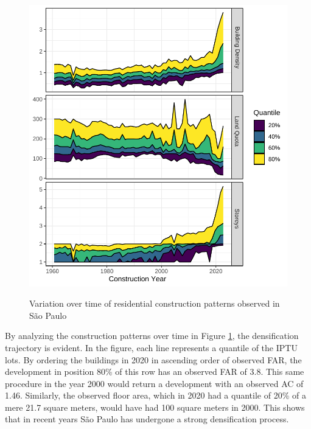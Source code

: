 \begin{apendicesenv}
    \clearpage
    
    \begin{figure}[h]
        \centering
        \caption{Variation over time of residential construction patterns observed in São Paulo}
        \includegraphics[width = .75\linewidth]{figuras/indicadores_tempo.pdf}
        \label{fig:indicadores-tempo}
    \end{figure}
    
    By analyzing the construction patterns over time in Figure \ref{fig:indicadores-tempo}, the densification trajectory is evident. In the figure, each line represents a quantile of the IPTU lots. By ordering the buildings in 2020 in ascending order of observed FAR, the development in position 80\% of this row has an observed FAR of 3.8. This same procedure in the year 2000 would return a development with an observed AC of 1.46. Similarly, the observed floor area, which in 2020 had a quantile of 20\% of a mere 21.7 square meters, would have had 100 square meters in 2000. This shows that in recent years São Paulo has undergone a strong densification process.
    
    
    \clearpage
    

\end{apendicesenv}
